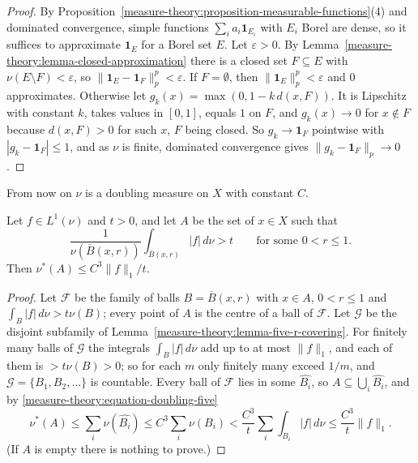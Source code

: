 \begin{proof}
By Proposition~\ref{measure-theory:proposition-measurable-functions}(4) and dominated convergence, simple functions $\sum_ia_i\mathbf{1}_{E_i}$ with $E_i$ Borel are dense, so it suffices to approximate
$\mathbf{1}_E$ for a Borel set $E$. Let $\varepsilon > 0$. By Lemma~\ref{measure-theory:lemma-closed-approximation} there is a closed set $F \subseteq E$ with $\nu(E \setminus F) < \varepsilon$, so
$\|\mathbf{1}_E - \mathbf{1}_F\|_p^p < \varepsilon$. If $F = \emptyset$, then $\|\mathbf{1}_E\|_p^p < \varepsilon$ and $0$ approximates. Otherwise let $g_k(x) = \max(0, 1 - k\,d(x, F))$. It is Lipschitz with constant $k$, takes values in $[0, 1]$,
equals $1$ on $F$, and $g_k(x) \to 0$ for $x \notin F$ because $d(x, F) > 0$ for such $x$, $F$ being closed. So $g_k \to \mathbf{1}_F$ pointwise with $|g_k - \mathbf{1}_F| \leq 1$, and as $\nu$ is finite,
dominated convergence gives $\|g_k - \mathbf{1}_F\|_p \to 0$.
\end{proof}

From now on $\nu$ is a doubling measure on $X$ with constant $C$.

\begin{theorem}\label{measure-theory:theorem-doubling-maximal}
Let $f \in L^1(\nu)$ and $t > 0$, and let $A$ be the set of $x \in X$ such that
\[
\frac{1}{\nu(\overline{B}(x, r))}\int_{\overline{B}(x, r)}|f|\,d\nu > t \qquad \text{for some } 0 < r \leq 1 .
\]
Then $\nu^*(A) \leq C^3\|f\|_1/t$.
\end{theorem}

\begin{proof}
Let $\mathcal{F}$ be the family of balls $B = \overline{B}(x, r)$ with $x \in A$, $0 < r \leq 1$ and $\int_B|f|\,d\nu > t\nu(B)$; every point of $A$ is the centre of a ball of $\mathcal{F}$. Let
$\mathcal{G}$ be the disjoint subfamily of Lemma~\ref{measure-theory:lemma-five-r-covering}. For finitely many balls of $\mathcal{G}$ the integrals $\int_B|f|\,d\nu$ add up to at most $\|f\|_1$, and each of them is
$> t\nu(B) > 0$; so for each $m$ only finitely many exceed $1/m$, and $\mathcal{G} = \{B_1, B_2, \ldots\}$ is countable. Every ball of $\mathcal{F}$ lies in some $\widehat{B_i}$, so
$A \subseteq \bigcup_i\widehat{B_i}$, and by \eqref{measure-theory:equation-doubling-five}
\[
\nu^*(A) \leq \sum_i\nu(\widehat{B_i}) \leq C^3\sum_i\nu(B_i) < \frac{C^3}{t}\sum_i\int_{B_i}|f|\,d\nu \leq \frac{C^3}{t}\|f\|_1 .
\]
(If $A$ is empty there is nothing to prove.)
\end{proof}

